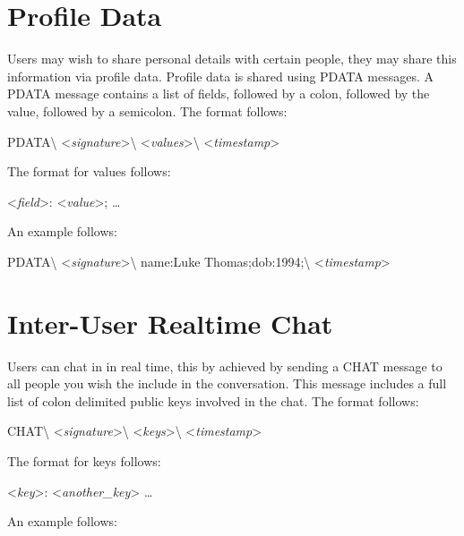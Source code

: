 \section{Profile Data}
Users may wish to share personal details with certain people, they may share
this information via profile data. Profile data is shared using PDATA messages.
A PDATA message contains a list of fields, followed by a colon, followed by the
value, followed by a semicolon. The format follows:

\begin{center}
PDATA\textbackslash
\textless \textit{signature}\textgreater\textbackslash
\textless \textit{values}\textgreater\textbackslash
\textless \textit{timestamp}\textgreater
\end{center}

The format for values follows:

\begin{center}
\textless \textit{field}\textgreater:
\textless \textit{value}\textgreater;
\ldots
\end{center}

An example follows:

\begin{center}
PDATA\textbackslash
\textless \textit{signature}\textgreater\textbackslash
name:Luke Thomas;dob:1994;\textbackslash
\textless \textit{timestamp}\textgreater
\end{center}

\section{Inter-User Realtime Chat}
Users can chat in in real time, this by achieved by sending a CHAT message to
all people you wish the include in the conversation. This message includes a
full list of colon delimited public keys involved in the chat. The format
follows:

\begin{center}
CHAT\textbackslash
\textless \textit{signature}\textgreater\textbackslash
\textless \textit{keys}\textgreater\textbackslash
\textless \textit{timestamp}\textgreater
\end{center}

The format for keys follows:

\begin{center}
\textless \textit{key}\textgreater:
\textless \textit{another\_key}\textgreater
\ldots
\end{center}

An example follows:

